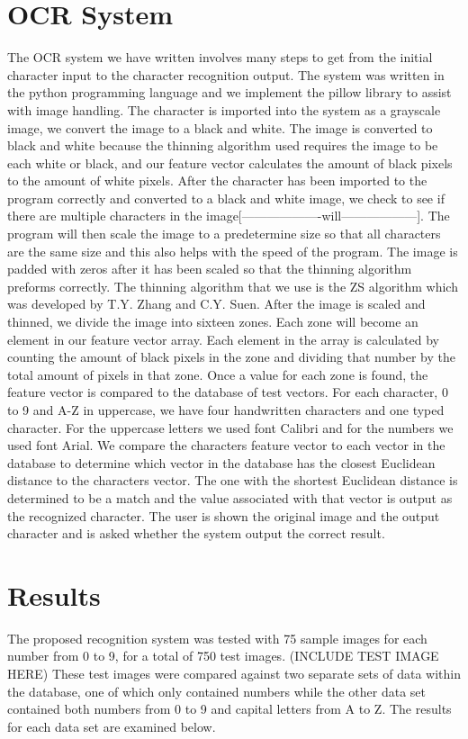 \documentclass{article}
\begin{document}
\begin{multicols}{2}
\section{OCR System}
The OCR system we have written involves many steps to get from the initial character input to the character recognition output. The system was written in the python programming language and we implement the pillow library to assist with image handling.  The character is imported into the system as a grayscale image, we convert the image to a black and white.  The image is converted to black and white because the thinning algorithm used requires the image to be each white or black, and our feature vector calculates the amount of black pixels to the amount of white pixels.  After the character has been imported to the program correctly and converted to a black and white image, we check to see if there are multiple characters in the image[-------------------will------------------].  The program will then scale the image to a predetermine size so that all characters are the same size and this also helps with the speed of the program.  The image is padded with zeros after it has been scaled so that the thinning algorithm preforms correctly.  The thinning algorithm that we use is the ZS algorithm which was developed by T.Y. Zhang and C.Y. Suen.  After the image is scaled and thinned, we divide the image into sixteen zones.  Each zone will become an element in our feature vector array.  Each element in the array is calculated by counting the amount of black pixels in the zone and dividing that number by the total amount of pixels in that zone.  Once a value for each zone is found, the feature vector is compared to the database of test vectors.  For each character, 0 to 9 and A-Z in uppercase, we have four handwritten characters and one typed character. For the uppercase letters we used font Calibri and for the numbers we used font Arial.  We compare the characters feature vector to each vector in the database to determine which vector in the database has the closest Euclidean distance to the characters vector.  The one with the shortest Euclidean distance is determined to be a match and the value associated with that vector is output as the recognized character.  The user is shown the original image and the output character and is asked whether the system output the correct result. 
\section{Results}
The proposed recognition system was tested with 75 sample images for each number from 0 to 9, for a total of 750 test images. (INCLUDE TEST IMAGE HERE) These test images were compared against two separate sets of data within the database, one of which only contained numbers while the other data set contained both numbers from 0 to 9 and capital letters from A to Z. The results for each data set are examined below.

\end{multicols}
\end{document}
